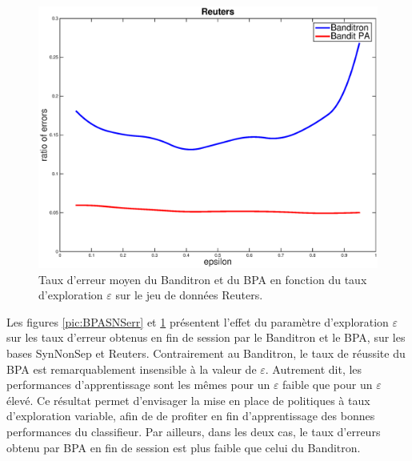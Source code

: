 \documentclass[twocolumn]{article}
\begin{document}
\begin{figure}[ht!]
	\centerline{
		\includegraphics[width=\linewidth]{figs/Reuters_gamma.eps}}
	\caption{Taux d'erreur moyen du Banditron et du BPA en fonction du taux d'exploration $\varepsilon$ sur le jeu de données Reuters.}
	\label{pic:BPARCVerr}
\end{figure}

Les figures \ref{pic:BPASNSerr} et  \ref{pic:BPARCVerr}  présentent l'effet du paramètre d'exploration $\varepsilon$ sur les taux d'erreur obtenus en fin de session par le Banditron et le BPA, sur les bases SynNonSep et Reuters. Contrairement au Banditron, le taux de réussite du BPA est remarquablement insensible à la valeur de $\varepsilon$. Autrement dit, les performances d'apprentissage sont les mêmes pour un $\varepsilon$ faible que pour un $\varepsilon$ élevé. Ce résultat permet d'envisager la mise en place de politiques à taux d'exploration variable, afin de de profiter en fin d'apprentissage des bonnes performances du classifieur.
Par ailleurs, dans les deux cas, le taux d'erreurs obtenu par BPA en fin de session est plus faible que celui du Banditron. 


	

\end{document}
